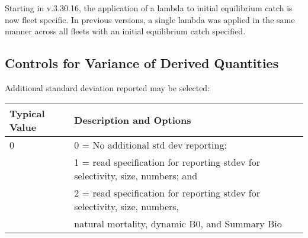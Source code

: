Starting in v.3.30.16, the application of a lambda to initial equilibrium catch is now fleet specific. In previous versions, a single lambda was applied in the same manner across all fleets with an initial equilibrium catch specified.

\pagebreak

\subsection{Controls for Variance of Derived Quantities}
Additional standard deviation reported may be selected:

\begin{longtable}{p{1.1cm} p{1.4cm} p{1.2cm} p{1.2cm} p{1.3cm} p{1.6cm} p{1.4cm} p{1.4cm} p{1.4cm}}

	\hline
	\multicolumn{3}{l}{Typical Value} & \multicolumn{6}{l}{Description and Options} \Tstrut\Bstrut\\
	\hline
	\endfirsthead


	\multicolumn{3}{l}{0} & \multicolumn{6}{l}{0 = No additional std dev reporting;} \Tstrut\\
	\multicolumn{3}{l}{ } & \multicolumn{6}{l}{1 = read specification for reporting stdev for selectivity, size, numbers; and} \Bstrut\\
	\multicolumn{3}{l}{ } & \multicolumn{6}{l}{2 = read specification for reporting stdev for selectivity, size, numbers,} \Bstrut\\
	\multicolumn{3}{l}{ } & \multicolumn{6}{l}{natural mortality, dynamic B0, and Summary Bio} \Bstrut\\
	\hline

\end{longtable}

